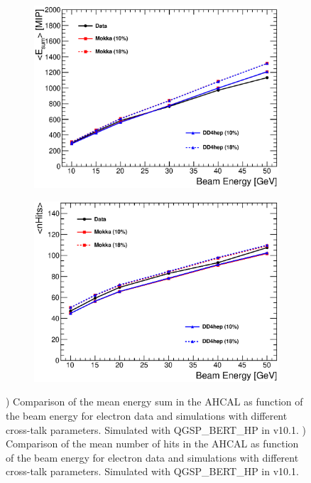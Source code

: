 \begin{figure}[htbp!]
	\centering
	\begin{subfigure}[t]{0.49\textwidth}
		\includegraphics[width=1.\linewidth]{../Thesis_Plots/EnergyCalib/Plots/EsumElectrons_BeamEnergy.eps}
		\caption{} \label{fig:EsumMeanElectron}
	\end{subfigure}
	\hfill
	\begin{subfigure}[t]{0.49\textwidth}
		\includegraphics[width=1.\linewidth]{../Thesis_Plots/EnergyCalib/Plots/nHitsElectrons_BeamEnergy.eps}
		\caption{} \label{fig:nHitsMeanElectron}
	\end{subfigure}
	\caption{) Comparison of the mean energy sum in the AHCAL as function of the beam energy for electron data and simulations with different cross-talk parameters. Simulated with QGSP\_BERT\_HP in \geant v10.1. ) Comparison of the mean number of hits in the AHCAL as function of the beam energy for electron data and simulations with different cross-talk parameters. Simulated with QGSP\_BERT\_HP in \geant v10.1.}
	\label{fig:eVal}
\end{figure}

